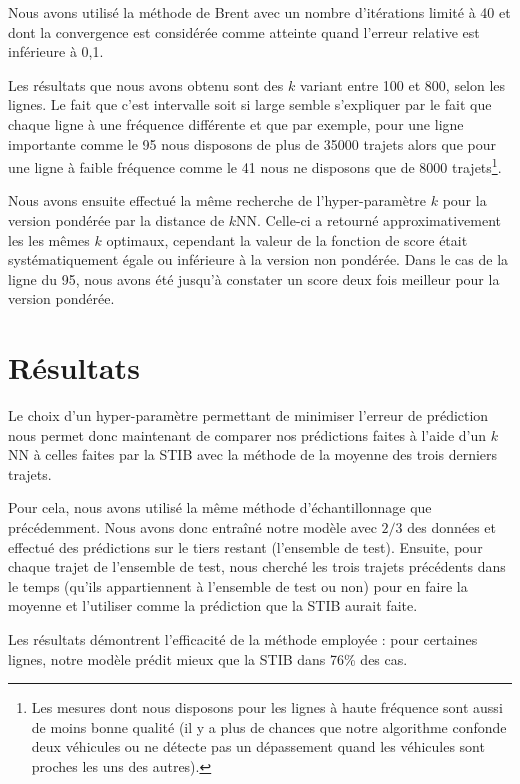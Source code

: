 \documentclass[letterpaper]{article}
\begin{document}
Nous avons utilisé la méthode de Brent avec un nombre d'itérations limité à 40 et dont la convergence est considérée comme atteinte quand l'erreur relative est inférieure à 0,1.

Les résultats que nous avons obtenu sont des $k$ variant entre 100 et 800, selon les lignes. Le fait que c'est intervalle soit si large semble s'expliquer par le fait que chaque ligne à une fréquence différente et que par exemple, pour une ligne importante comme le 95 nous disposons de plus de 35000 trajets alors que pour une ligne à faible fréquence comme le 41 nous ne disposons que de 8000 trajets\footnote{Les mesures dont nous disposons pour les lignes à haute fréquence sont aussi de moins bonne qualité (il y a plus de chances que notre algorithme confonde deux véhicules ou ne détecte pas un dépassement quand les véhicules sont proches les uns des autres).}.

Nous avons ensuite effectué la même recherche de l'hyper-paramètre $k$ pour la version pondérée par la distance de $k$NN. Celle-ci a retourné approximativement les les mêmes $k$ optimaux, cependant la valeur de la fonction de score était systématiquement égale ou inférieure à la version non pondérée. Dans le cas de la ligne du 95, nous avons été jusqu'à constater un score deux fois meilleur pour la version pondérée.

\section{Résultats}

Le choix d'un hyper-paramètre permettant de minimiser l'erreur de prédiction nous permet donc maintenant de comparer nos prédictions faites à l'aide d'un $k$NN à celles faites par la STIB avec la méthode de la moyenne des trois derniers trajets.

Pour cela, nous avons utilisé la même méthode d'échantillonnage que précédemment. Nous avons donc entraîné notre modèle avec $2/3$ des données et effectué des prédictions sur le tiers restant (l'ensemble de test). Ensuite, pour chaque trajet de l'ensemble de test, nous cherché les trois trajets précédents dans le temps (qu'ils appartiennent à l'ensemble de test ou non) pour en faire la moyenne et l'utiliser comme la prédiction que la STIB aurait faite.

Les résultats démontrent l'efficacité de la méthode employée : pour certaines lignes, notre modèle prédit mieux que la STIB dans 76\% des cas.
\end{document}

